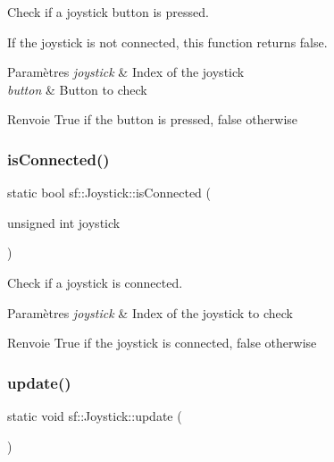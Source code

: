 Check if a joystick button is pressed. 

If the joystick is not connected, this function returns false.


\begin{DoxyParams}{Paramètres}
{\em joystick} & Index of the joystick \\
\hline
{\em button} & Button to check\\
\hline
\end{DoxyParams}
\begin{DoxyReturn}{Renvoie}
True if the button is pressed, false otherwise 
\end{DoxyReturn}
\mbox{\label{classsf_1_1Joystick_ac7d4e1923e9f9420174f26703ea63d6c}} 
\subsubsection{\texorpdfstring{is\+Connected()}{isConnected()}}
{\footnotesize\ttfamily static bool sf\+::\+Joystick\+::is\+Connected (\begin{DoxyParamCaption}\item[{unsigned int}]{joystick }\end{DoxyParamCaption})\hspace{0.3cm}{\ttfamily [static]}}



Check if a joystick is connected. 


\begin{DoxyParams}{Paramètres}
{\em joystick} & Index of the joystick to check\\
\hline
\end{DoxyParams}
\begin{DoxyReturn}{Renvoie}
True if the joystick is connected, false otherwise 
\end{DoxyReturn}
\mbox{\label{classsf_1_1Joystick_ab85fa9175b4edd3e5a07ee3cde0b0f48}} 
\subsubsection{\texorpdfstring{update()}{update()}}
{\footnotesize\ttfamily static void sf\+::\+Joystick\+::update (\begin{DoxyParamCaption}{ }\end{DoxyParamCaption})\hspace{0.3cm}{\ttfamily [static]}}



